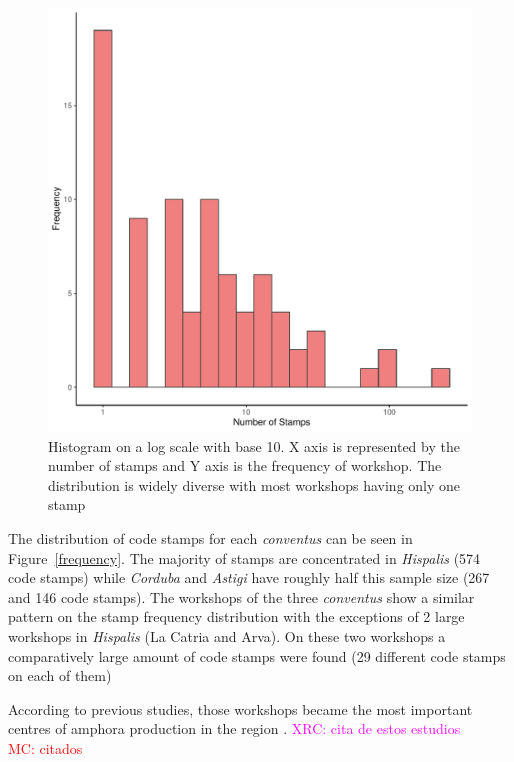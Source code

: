 \documentclass[review]{elsarticle}
\newcommand{\memo}[2]{\textcolor{#1}{#2}}
\newcommand{\maria}[1]{\memo{red}{MC: #1\\}}
\newcommand{\xavi}[1]{\memo{magenta}{XRC: #1\\}}
\begin{document}
\begin{figure}[htp]
	\centering
\includegraphics[width=\linewidth]{figs/frequencystamp.pdf}
\caption{Histogram on a log scale with base 10. X axis is represented by the number of stamps and Y axis is the frequency of workshop. The distribution is widely diverse with most workshops having only one stamp}
\label{stamps}
\end{figure} 


The distribution of code stamps for each \textit{conventus} can be seen in Figure~\ref{frequency}. The majority of stamps are concentrated in \textit{Hispalis} (574 code stamps) while \textit{Corduba} and \textit{Astigi} have roughly half this sample size (267 and 146 code stamps). The workshops of the three \textit{conventus} show a similar pattern on the stamp frequency distribution with the exceptions of 2 large workshops in \textit{Hispalis} (La Catria and Arva). On these two workshops a comparatively large amount of code stamps were found (29 different code stamps on each of them)


According to previous studies, those workshops became the most important centres of amphora production in the region \citep{rodriguez_economioleicola_1977,
arva_1997}.
\xavi{cita de estos estudios}
\maria{citados}
\end{document}
